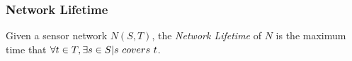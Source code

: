 \subsubsection{Network Lifetime}
\label{sub:mvc}
Given a sensor network $N(S,T)$, the {\em Network Lifetime} of $N$ is the maximum time that $\forall t \in T, \exists s \in S | s{\text \ covers\  } t$.